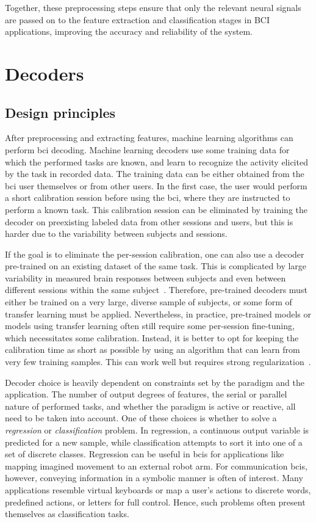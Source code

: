 Together, these preprocessing steps ensure that only the relevant neural signals are
passed on to the feature extraction and classification stages in BCI applications,
improving the accuracy and reliability of the system.

\section{Decoders}
\label{sec:bci/decoding}

\subsection{Design principles}

After preprocessing and extracting features, machine learning algorithms can perform
\ac{bci} decoding.
Machine learning decoders use some training data for which the performed tasks are
known, and learn to recognize the activity elicited by the task in recorded data.
The training data can be either obtained from the \ac{bci} user themselves or from other
users.
In the first case, the user would perform a short calibration session before using the
\ac{bci}, where they are instructed to perform a known task.
This calibration session can be eliminated by training the decoder on preexisting
labeled data from other sessions and users, but this is harder due to the variability
between subjects and sessions.

If the goal is to eliminate the per-session calibration, one can also use a decoder
pre-trained on an existing dataset of the same task.
This is complicated by large variability in measured brain responses between subjects
and even between different sessions within the same subject~\cite{Guger2009,Saha2020}.
Therefore, pre-trained decoders must either be trained on a very large, diverse sample
of subjects, or some form of transfer learning must be applied.
Nevertheless, in practice, pre-trained models or models using transfer learning often
still require some per-session fine-tuning, which necessitates some calibration.
Instead, it is better to opt for keeping the calibration time as short as possible by
using an algorithm that can learn from very few training samples.
This can work well but requires strong regularization~\cite{VanDenKerchove2022}.

Decoder choice is heavily dependent on constraints set by the paradigm and the
application.
The number of output degrees of features, the serial or parallel nature of performed
tasks, and whether the paradigm is active or reactive, all need to be taken into
account.
One of these choices is whether to solve a \emph{regression} or \emph{classification}
problem.
In regression, a continuous output variable is predicted for a new sample, while
classification attempts to sort it into one of a set of discrete classes.
Regression can be useful in \acp{bci} for applications like mapping imagined movement to
an external robot arm.
For communication \acp{bci}, however, conveying information in a symbolic manner is
often of interest.
Many applications resemble virtual keyboards or map a user's actions to discrete words,
predefined actions, or letters for full control.
Hence, such problems often present themselves as classification tasks.

